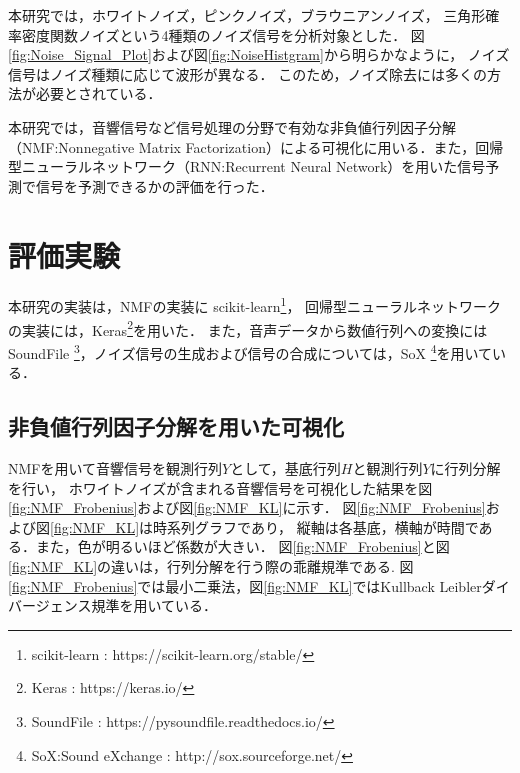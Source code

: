 \documentclass{deimj}
\begin{document}
本研究では，ホワイトノイズ，ピンクノイズ，ブラウニアンノイズ，
三角形確率密度関数ノイズという4種類のノイズ信号を分析対象とした．
図\ref{fig:Noise_Signal_Plot}および図\ref{fig:NoiseHistgram}から明らかなように，
ノイズ信号はノイズ種類に応じて波形が異なる．
このため，ノイズ除去には多くの方法が必要とされている．

本研究では，音響信号など信号処理の分野で有効な非負値行列因子分解（NMF:Nonnegative Matrix Factorization）\cite{NMF}による可視化に用いる．また，回帰型ニューラルネットワーク（RNN:Recurrent Neural Network）を用いた信号予測で信号を予測できるかの評価を行った．

\vspace{-6pt}
\section{評価実験}
\vspace{-6pt}
本研究の実装は，NMFの実装に
scikit-learn\footnote{scikit-learn : https://scikit-learn.org/stable/}，
回帰型ニューラルネットワークの実装には，Keras\footnote{Keras : https://keras.io/}を用いた\cite{chollet2015keras}．
%
また，音声データから数値行列への変換にはSoundFile
\footnote{SoundFile : https://pysoundfile.readthedocs.io/}，ノイズ信号の生成および信号の合成については，SoX
\footnote{SoX:Sound eXchange : http://sox.sourceforge.net/}を用いている．

\newpage
\subsection{非負値行列因子分解を用いた可視化}
NMFを用いて音響信号を観測行列$Y$として，基底行列$H$と観測行列$Y$に行列分解を行い，
ホワイトノイズが含まれる音響信号を可視化した結果を図\ref{fig:NMF_Frobenius}および図\ref{fig:NMF_KL}に示す．
図\ref{fig:NMF_Frobenius}および図\ref{fig:NMF_KL}は時系列グラフであり，
縦軸は各基底，横軸が時間である．また，色が明るいほど係数が大きい．
%
図\ref{fig:NMF_Frobenius}と図\ref{fig:NMF_KL}の違いは，行列分解を行う際の乖離規準である.
図\ref{fig:NMF_Frobenius}では最小二乗法，図\ref{fig:NMF_KL}ではKullback Leiblerダイバージェンス規準を用いている．
\end{document}
